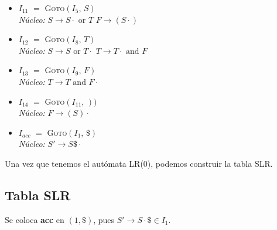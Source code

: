 \documentclass[12pt, letterpaper]{article}
\begin{document}
\begin{enumerate}
\begin{itemize}
\item \textbf{$I_{11}$} $=$ \textsc{Goto}$(I_{5},\,S)$ \\
\textit{Núcleo:} $S \to S \cdot \text{ or } T$ \quad $F \to ( S \cdot )$

\item \textbf{$I_{12}$} $=$ \textsc{Goto}$(I_{8},\,T)$ \\
\textit{Núcleo:} $S \to S \text{ or } T \cdot $ \quad $T \to T \cdot \text{ and } F$

\item \textbf{$I_{13}$} $=$ \textsc{Goto}$(I_{9},\,F)$ \\
\textit{Núcleo:} $T \to T \text{ and } F \cdot $

\item \textbf{$I_{14}$} $=$ \textsc{Goto}$(I_{11},\,))$ \\
\textit{Núcleo:} $F \to ( S ) \cdot $

\item \textbf{$I_{acc}$} $=$ \textsc{Goto}$(I_{1},\,\$)$ \\
\textit{Núcleo:} $S' \to S \$ \cdot $
\end{itemize}

Una vez que tenemos el autómata LR(0), podemos construir la tabla SLR.

\subsection*{Tabla SLR}

Se coloca \textbf{acc} en $(1,\$)$, pues $S' \to S \cdot \$ \in I_1$.


\end{enumerate}
\end{document}
